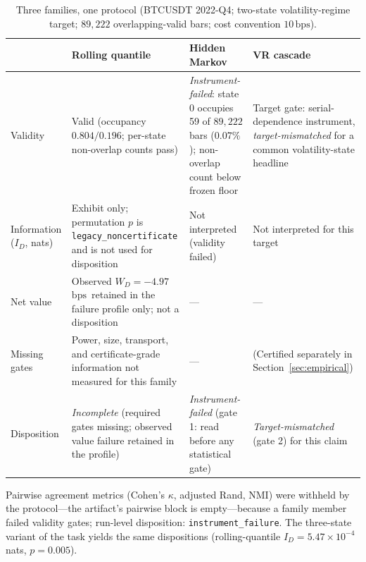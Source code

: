 \documentclass[3p]{elsarticle}
\newcommand{\bps}{\ensuremath{\mathrm{bps}}}
\begin{document}
\begin{table}[htbp]
\centering
\begin{threeparttable}
\caption{Three families, one protocol (BTCUSDT 2022-Q4; two-state
volatility-regime target; $89{,}222$ overlapping-valid bars; cost convention
$10$\,\bps).}
\label{tab:families}
\small
\begin{tabularx}{\textwidth}{@{}lXXX@{}}
\toprule
 & Rolling quantile & Hidden Markov & VR cascade \\
\midrule
Validity & Valid (occupancy $0.804/0.196$; per-state non-overlap counts pass) & \emph{Instrument-failed}: state 0 occupies 59 of $89{,}222$ bars ($0.07\%$); non-overlap count below frozen floor & Target gate: serial-dependence instrument, \emph{target-mismatched} for a common volatility-state headline \\
Information ($I_D$, nats) & Exhibit only; permutation $p$ is
\texttt{legacy\_noncertificate} and is not used for disposition & Not interpreted (validity failed) & Not interpreted for this target \\
Net value & Observed $W_D=-4.97$\,\bps\ retained in the failure profile only; not a disposition & --- & --- \\
Missing gates & Power, size, transport, and certificate-grade information not measured for this family & --- & (Certified separately in Section~\ref{sec:empirical}) \\
Disposition & \emph{Incomplete} (required gates missing; observed value failure retained in the profile) & \emph{Instrument-failed} (gate 1: read before any statistical gate) & \emph{Target-mismatched} (gate 2) for this claim \\
\bottomrule
\end{tabularx}
\begin{tablenotes}\footnotesize
\item Pairwise agreement metrics (Cohen's $\kappa$, adjusted Rand, NMI) were
withheld by the protocol---the artifact's pairwise block is empty---because a
family member failed validity gates; run-level disposition:
\texttt{instrument\_failure}. The three-state variant of the task yields the
same dispositions (rolling-quantile $I_D=5.47\times10^{-4}$ nats,
$p=0.005$).
\end{tablenotes}
\end{threeparttable}
\end{table}
\end{document}
